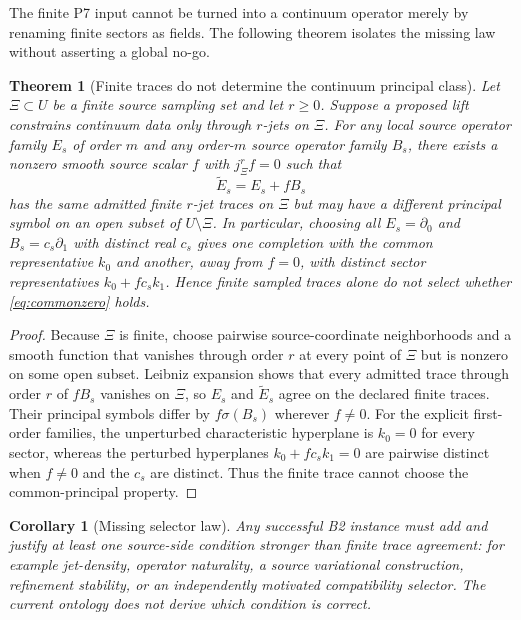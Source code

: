 \documentclass[11pt]{article}
\theoremstyle{definition}
\theoremstyle{plain}
\newtheorem{theorem}{Theorem}
\newtheorem{corollary}{Corollary}
\begin{document}
The finite P7 input cannot be turned into a continuum operator merely by
renaming finite sectors as fields. The following theorem isolates the missing
law without asserting a global no-go.

\begin{theorem}[Finite traces do not determine the continuum principal class]
Let $\Xi\subset U$ be a finite source sampling set and let $r\ge0$. Suppose a
proposed lift constrains continuum data only through $r$-jets on $\Xi$. For
any local source operator family $E_s$ of order $m$ and any order-$m$ source
operator family $B_s$, there exists a nonzero smooth source scalar $f$ with
$j^r_{\Xi}f=0$ such that
\[
  \widetilde E_s=E_s+fB_s
\]
has the same admitted finite $r$-jet traces on $\Xi$ but may have a different
principal symbol on an open subset of $U\setminus\Xi$. In particular, choosing
all $E_s=\partial_0$ and
$B_s=c_s\partial_1$ with distinct real $c_s$ gives one completion with the
common representative $k_0$ and another, away from $f=0$, with distinct
sector representatives $k_0+fc_sk_1$. Hence finite sampled traces alone do not
select whether \eqref{eq:commonzero} holds.
\end{theorem}

\begin{proof}
Because $\Xi$ is finite, choose pairwise source-coordinate neighborhoods and
a smooth function that vanishes through order $r$ at every point of $\Xi$ but
is nonzero on some open subset. Leibniz expansion shows that every admitted
trace through order $r$ of $fB_s$ vanishes on $\Xi$, so $E_s$ and
$\widetilde E_s$ agree on the declared finite traces. Their principal symbols
differ by $f\sigma(B_s)$ wherever $f\ne0$. For the explicit first-order
families, the unperturbed characteristic hyperplane is $k_0=0$ for every
sector, whereas the perturbed hyperplanes $k_0+fc_sk_1=0$ are pairwise
distinct when $f\ne0$ and the $c_s$ are distinct. Thus the finite trace cannot
choose the common-principal property.
\end{proof}

\begin{corollary}[Missing selector law]
Any successful B2 instance must add and justify at least one source-side
condition stronger than finite trace agreement: for example jet-density,
operator naturality, a source variational construction, refinement stability,
or an independently motivated compatibility selector. The current ontology
does not derive which condition is correct.
\end{corollary}
\end{document}
